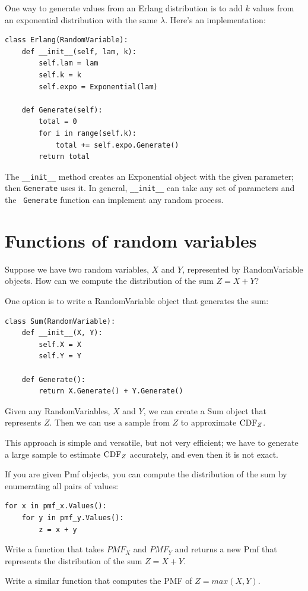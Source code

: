 \documentclass[12pt]{book}
\begin{document}
One way to generate values from an Erlang distribution is to add
$k$ values from an exponential distribution with the same $\lambda$.
Here's an implementation:
%
\begin{verbatim}
class Erlang(RandomVariable):
    def __init__(self, lam, k):
        self.lam = lam
        self.k = k
        self.expo = Exponential(lam)

    def Generate(self):
        total = 0
        for i in range(self.k):
            total += self.expo.Generate()
        return total
\end{verbatim}

The \verb"__init__" method creates an Exponential object with the
given parameter; then {\tt Generate} uses it.  In general,
\verb"__init__" can take any set of parameters and the {\tt
  Generate} function can implement any random process.


\section{Functions of random variables}

Suppose we have two random variables, $X$ and $Y$, represented
by RandomVariable objects.
How can we compute the distribution of the sum $Z = X + Y$?

One option is to write a RandomVariable object that generates
the sum:
%
\begin{verbatim}
class Sum(RandomVariable):
    def __init__(X, Y):
        self.X = X
        self.Y = Y

    def Generate():
        return X.Generate() + Y.Generate()
\end{verbatim}

Given any RandomVariables, $X$ and $Y$, we can create a Sum
object that represents $Z$.  Then we can use a sample from $Z$ to
approximate $\mathrm{CDF}_{Z}$.

This approach is simple and versatile, but not very efficient; we
have to generate a large sample to estimate $\mathrm{CDF}_{Z}$ accurately, and
even then it is not exact.



\begin{exercise}

If you are given Pmf objects, you can compute the distribution of
the sum by enumerating all pairs of values:
%
\begin{verbatim}
for x in pmf_x.Values():
    for y in pmf_y.Values():
        z = x + y
\end{verbatim}

Write a function that takes $PMF_{X}$ and
$PMF_{Y}$ and returns a new Pmf that represents the distribution of
the sum $Z = X + Y$.

Write a similar function that computes the PMF of $Z = max(X, Y)$.

\end{exercise}
\end{document}
